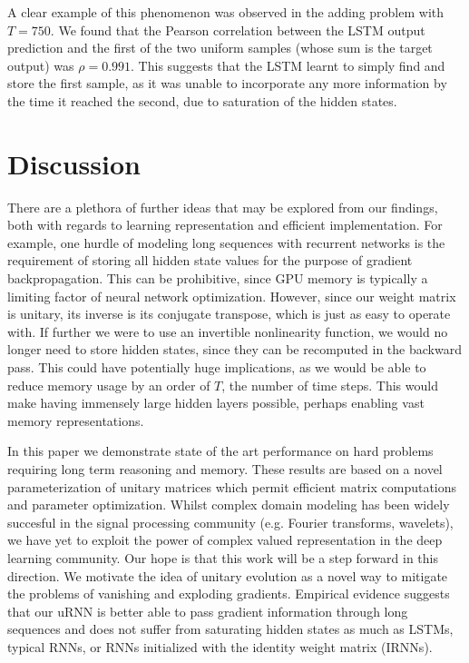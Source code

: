 \documentclass{article} %
\begin{document}
A clear example of this phenomenon was observed in the adding problem with $T=750$. We found that the 
Pearson correlation between the LSTM output prediction and the first of the two uniform samples (whose 
sum is the target output) was $\rho = 0.991$. This suggests that the LSTM learnt to simply find and store the 
first sample, as it was unable to 
incorporate any more information by the time it reached the second, due to 
saturation of the hidden states.   

\vspace{-2.5mm}
\section{Discussion}
\vspace{-1mm}
There are a plethora of further ideas that may be explored from our findings, both with regards to 
learning representation and efficient implementation. For example, one hurdle of modeling long sequences 
with recurrent networks is the requirement of storing all hidden state values for the purpose of gradient
backpropagation. This can be prohibitive, since GPU memory is typically a limiting factor of neural network 
optimization. However, since our weight matrix is unitary, its inverse is its conjugate transpose, 
which is just as easy to operate with. If further we were to use an invertible nonlinearity function, we would 
no longer need to store hidden states, since they can be recomputed in the backward pass. This could have 
potentially huge implications, as we would be able to reduce memory usage by an order of $T$, the number of
time steps. This would make having immensely large hidden layers possible, perhaps enabling vast memory representations.

In this paper we demonstrate state of the art performance on hard problems requiring
long term reasoning and memory. These results are based on a novel parameterization of unitary matrices which permit
efficient matrix computations and parameter optimization. Whilst complex domain modeling has been 
widely succesful in the signal processing community (e.g. Fourier transforms, wavelets), we have yet to 
exploit the power of complex valued representation in the deep learning community. Our hope is that this
work will be a step forward in this direction. We motivate the idea of unitary evolution as a novel way
to mitigate the problems of vanishing and exploding gradients. Empirical evidence suggests that our uRNN is better able
to pass gradient information through long sequences and does not suffer from saturating hidden states as much
as LSTMs, typical RNNs, or RNNs initialized with the identity weight matrix (IRNNs).
\end{document}
